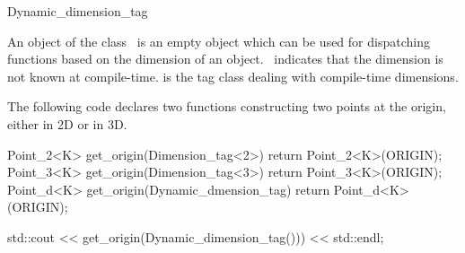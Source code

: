 \begin{ccRefClass} {Dynamic_dimension_tag}

\ccDefinition
An object of the class \ccRefName\ is an empty object which can be used
for dispatching functions based on the dimension of an object.
\ccRefName\ indicates that the dimension is not known at compile-time.
 is the tag class dealing with compile-time dimensions.


\ccCreation
{}

\ccExample

The following code declares two functions constructing two points at the origin,
either in 2D or in 3D.

\begin{cprog}
  Point_2<K> get_origin(Dimension_tag<2>) { return Point_2<K>(ORIGIN); }
  Point_3<K> get_origin(Dimension_tag<3>) { return Point_3<K>(ORIGIN); }
  Point_d<K> get_origin(Dynamic_dmension_tag) { return Point_d<K>(ORIGIN); }

  std::cout << get_origin(Dynamic_dimension_tag())) << std::endl;
\end{cprog}

\ccSeeAlso
{}

\end{ccRefClass}
